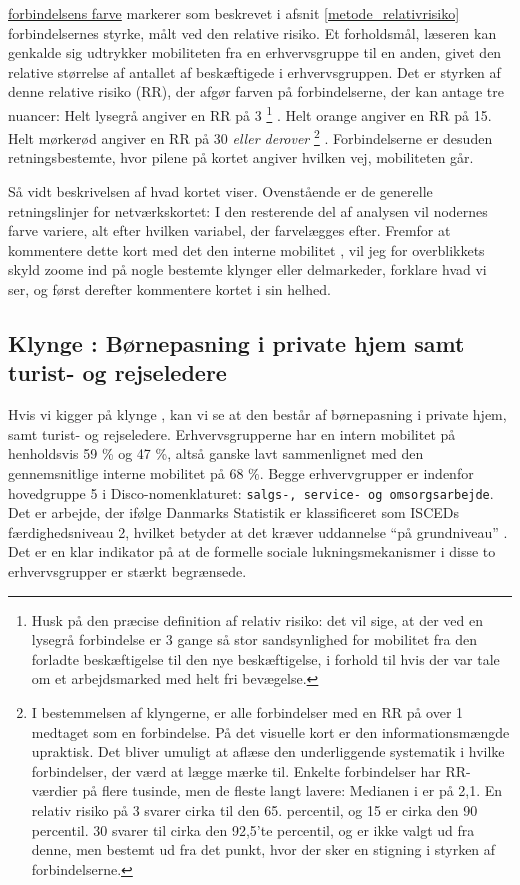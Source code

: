 \underline{forbindelsens farve} markerer som beskrevet i afsnit \ref{metode_relativrisiko} forbindelsernes styrke, målt ved den relative risiko. Et forholdsmål, læseren kan genkalde sig udtrykker mobiliteten fra en erhvervsgruppe til en anden, givet den relative størrelse af antallet af beskæftigede i erhvervsgruppen. Det er styrken af denne relative risiko (RR), der afgør farven på forbindelserne, der kan antage tre nuancer: Helt lysegrå angiver en RR på 3%
%
\footnote{Husk på den præcise definition af relativ risiko:  det vil sige, at der ved en lysegrå forbindelse er 3 gange så stor sandsynlighed for mobilitet fra den forladte beskæftigelse til den nye beskæftigelse, i forhold til hvis der var tale om et arbejdsmarked med helt fri bevægelse.}%
%
. Helt orange angiver en RR på 15. Helt mørkerød angiver en RR på 30 \emph{ eller derover}%
%
\footnote{ I bestemmelsen af klyngerne, er alle forbindelser med en RR på over 1 medtaget som en forbindelse. På det visuelle kort er den informationsmængde upraktisk. Det bliver umuligt at aflæse den underliggende systematik i hvilke forbindelser, der værd at lægge mærke til. Enkelte forbindelser har RR-værdier på flere tusinde, men de fleste langt lavere: Medianen i er på 2,1. En relativ risiko på 3 svarer cirka til den 65. percentil, og 15 er cirka den 90 percentil. 30 svarer til cirka den 92,5'te percentil, og er ikke valgt ud fra denne, men bestemt ud fra det punkt, hvor der sker en stigning i styrken af forbindelserne. }%
%
. Forbindelserne er desuden retningsbestemte, hvor pilene på kortet angiver hvilken vej, mobiliteten går.

Så vidt beskrivelsen af hvad kortet viser. Ovenstående er de generelle retningslinjer for netværkskortet: I den resterende del af analysen vil nodernes farve variere, alt efter hvilken variabel, der farvelægges efter. Fremfor at kommentere dette kort med det den interne mobilitet , vil jeg for overblikkets skyld zoome ind på nogle bestemte klynger eller delmarkeder, forklare hvad vi ser, og først derefter kommentere kortet i sin helhed.



\subsection{Klynge : Børnepasning i private hjem samt turist- og rejseledere}

Hvis vi kigger på klynge , kan vi se at den består af børnepasning i private hjem, samt turist- og rejseledere. Erhvervsgrupperne har en intern mobilitet på henholdsvis  59 \% og 47 \%, altså ganske lavt sammenlignet med den gennemsnitlige interne mobilitet på 68 \%.  Begge erhvervgrupper er indenfor hovedgruppe 5 i Disco-nomenklaturet: \texttt{salgs-, service- og omsorgsarbejde}. Det er arbejde, der ifølge Danmarks Statistik er klassificeret som ISCEDs færdighedsniveau 2, hvilket betyder at det kræver uddannelse “på grundniveau” \parencite[tabel 1]{DSTDISCO88}. Det er en klar indikator på at de formelle sociale lukningsmekanismer i disse to erhvervsgrupper er stærkt begrænsede.

